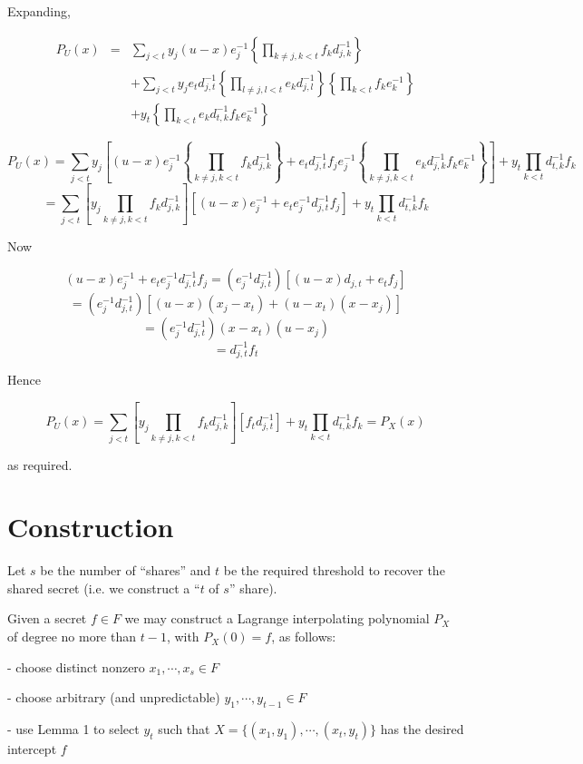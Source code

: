 \documentclass[]{article}
\begin{document}
Expanding,

\[
\begin{array}{rcl}
P_U(x) & = & \sum_{j<t}y_j(u-x)e_j^{-1}\left\{\prod_{k\ne j,k<t}f_kd_{j,k}^{-1}\right\} \\
& & + \sum_{j<t}y_je_td_{j,t}^{-1}
        \left\{\prod_{l\ne j,l<t}e_kd_{j,l}^{-1}\right\}
        \left\{\prod_{k<t}f_ke_k^{-1}\right\} \\
& & + y_t\left\{\prod_{k<t}e_kd_{t,k}^{-1}f_ke_k^{-1}\right\}
\end{array}
\]

\[
P_U(x) = \sum_{j<t}y_j\left[
        (u-x)e_j^{-1}\left\{\prod_{k\ne j,k<t}f_kd_{j,k}^{-1}\right\}
        + e_td_{j,t}^{-1}f_je_j^{-1}\left\{
            \prod_{k\ne j,k<t}e_kd_{j,k}^{-1}f_ke_k^{-1}
        \right\}
    \right]
    + y_t\prod_{k<t}d_{t,k}^{-1}f_k
\]\[
= \sum_{j<t} \left[y_j \prod_{k\ne j,k<t}f_kd_{j,k}^{-1}\right]
        \left[(u-x)e_j^{-1} + e_te_j^{-1}d_{j,t}^{-1}f_j\right]
        + y_t\prod_{k<t}d_{t,k}^{-1}f_k
\]

Now

\[
(u-x)e_j^{-1} + e_te_j^{-1}d_{j,t}^{-1}f_j
    = (e_j^{-1}d_{j,t}^{-1})\left[(u-x)d_{j,t} + e_tf_j\right]
\]\[
    = (e_j^{-1}d_{j,t}^{-1})\left[(u-x)(x_j-x_t) + (u-x_t)(x-x_j)\right]
\]\[
    = (e_j^{-1}d_{j,t}^{-1})(x - x_t)(u - x_j)
\]\[
    = d_{j,t}^{-1}f_t
\]

Hence

\[
P_U(x)
= \sum_{j<t} \left[y_j \prod_{k\ne j,k<t}f_kd_{j,k}^{-1}\right]
        \left[f_td_{j,t}^{-1}\right]
        + y_t\prod_{k<t}d_{t,k}^{-1}f_k = P_X(x)
\]

as required.

\section{Construction}

Let $s$ be the number of ``shares'' and $t$ be the required threshold
to recover the shared secret (i.e. we construct a ``$t$ of $s$'' share).

Given a secret $f\in F$ we may construct a Lagrange interpolating
polynomial $P_X$ of degree no more than $t-1$, with $P_X(0) = f$, as
follows:

- choose distinct nonzero $x_1,\cdots,x_s \in F$

- choose arbitrary (and unpredictable) $y_1,\cdots,y_{t-1} \in F$

- use Lemma 1 to select $y_t$ such that $X = \{(x_1,y_1),\cdots,(x_t,y_t)\}$
  has the desired intercept $f$
\end{document}
